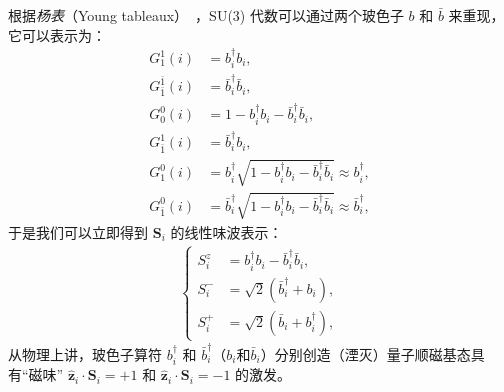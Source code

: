     根据\emph{杨表}（Young tableaux）~\cite{kim2017linear}，SU(3) 代数可以通过两个玻色子 $b$ 和 $\bar{b}$ 来重现，它可以表示为：
    \begin{align}
        G_1^1(i)&=b^\dagger_ib_i,\\
        G_{\bar{1}}^{\bar{1}}(i)&=\bar{b}^\dagger_i\bar{b}_i,\\
        G_0^0(i)&=1-b^\dagger_ib_i-\bar{b}^\dagger_i\bar{b}_i,\\
        G_{\bar{1}}^{1}(i)&=\bar{b}^\dagger_ib_i,\\
        G_1^0(i)&=b^\dagger_i\sqrt{1-b^\dagger_ib_i-\bar{b}^\dagger_i\bar{b}_i}\approx b^\dagger_i,\\
        G_{\bar{1}}^0(i)&=\bar{b}^\dagger_i\sqrt{1-b^\dagger_ib_i-\bar{b}^\dagger_i\bar{b}_i}\approx \bar{b}^\dagger_i,
    \end{align}
    于是我们可以立即得到 $\symbf{S}_i$ 的线性味波表示：
    \begin{align}
        \left\{\begin{array}{lll}
         S_i^z&=b^\dagger_i b_i-\bar{b}^\dagger_i \bar{b}_i,\\
         S_i^-&=\sqrt{2}(\bar{b}^\dagger_i+b_i),\\
         S_i^+&=\sqrt{2}(\bar{b}_i+b^\dagger_i),
        \end{array}
        \right.
    \end{align}
    从物理上讲，玻色子算符 $b^\dagger_i$ 和 $\bar{b}^\dagger_i$（$b_i$和$\bar{b}_i$）分别创造（湮灭）量子顺磁基态具有“磁味” $\hat{\symbf{z}}_i\cdot\symbf{S}_i=+1$ 和 $\hat{\symbf{z}}_i\cdot\symbf{S}_i=-1$ 的激发。
    
